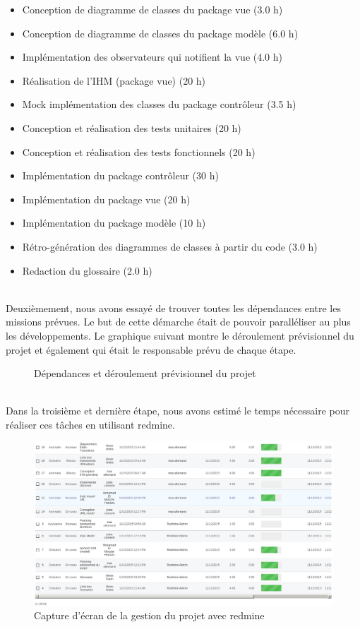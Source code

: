 \documentclass[10pt,a4paper]{book}
\begin{document}
\begin{itemize}
	\item{Conception de diagramme de classes du package vue (3.0 h)}
	\item{Conception de diagramme de classes du package modèle (6.0 h)}
	\item{Implémentation des observateurs qui notifient la vue (4.0 h)}
	\item{Réalisation de l'IHM (package vue) (20 h)}
	\item{Mock implémentation des classes du package contrôleur (3.5 h)}
	\item{Conception et réalisation des tests unitaires (20 h)}	
	\item{Conception et réalisation des tests fonctionnels (20 h)}
	\item{Implémentation du package contrôleur (30 h)}
	\item{Implémentation du package vue (20 h)}
	\item{Implémentation du package modèle (10 h)}
	\item{Rétro-génération des diagrammes de classes à partir du code (3.0 h)}
	\item{Redaction du glossaire (2.0 h)}
\end{itemize}
~\\Deuxièmement, nous avons essayé de trouver toutes les dépendances entre les missions prévues. Le but de cette démarche était de pouvoir paralléliser au plus les développements. Le graphique suivant montre le déroulement prévisionnel du projet et également qui était le responsable prévu de chaque étape.

\begin{figure}[ht!]
    \centering
    \scalebox{.65}{}
    \caption{Dépendances et déroulement prévisionnel du projet}
\end{figure}

~\\Dans la troisième et dernière étape, nous avons estimé le temps nécessaire pour réaliser ces tâches en utilisant redmine.
\begin{figure}
    \centering
    \includegraphics[scale=0.25]{redmine.png}
    \caption{Capture d'écran de la gestion du projet avec redmine} 
\end{figure}
\end{document}
